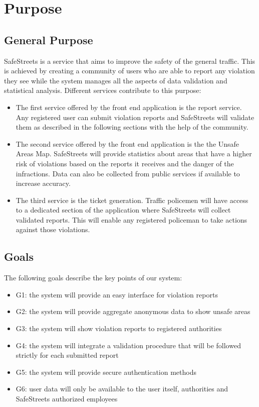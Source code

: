 \section{Purpose}

\subsection{General Purpose}
SafeStreets is a service that aims to improve the safety of the general traffic.
This is achieved by creating a community of users who are able to report any violation they see while the system manages
all the aspects of data validation and statistical analysis.
Different services contribute to this purpose:
\begin{itemize}
  \item The first service offered by the front end application is the report service. Any registered user can submit violation reports and SafeStreets will validate them as described in the following sections with the help of the community.
  \item The second service offered by the front end application is the the Unsafe Areas Map. SafeStreets will provide statistics about areas that have a higher risk of violations based on the reports it receives and the danger of the infractions. Data can also be collected from public services if available to increase accuracy.
  \item The third service is the ticket generation. Traffic policemen will have access to a dedicated section of the application where SafeStreets will collect validated reports. This will enable any registered policeman to take actions against those violations.
\end{itemize}

\subsection{Goals}
The following goals describe the key points of our system:
\begin{itemize}
  \item G1: the system will provide an easy interface for violation reports
  \item G2: the system will provide aggregate anonymous data to show unsafe areas
  \item G3: the system will show violation reports to registered authorities
  \item G4: the system will integrate a validation procedure that will be followed strictly for each submitted report
  \item G5: the system will provide secure authentication methods
  \item G6: user data will only be available to the user itself, authorities and SafeStreets authorized employees
\end{itemize}